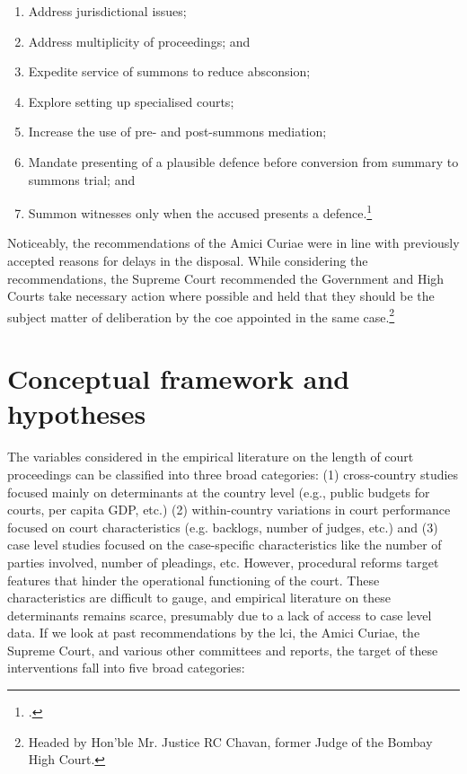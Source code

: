 \documentclass[12pt,a4paper]{article}
\begin{document}
\begin{enumerate}[label=(\alph*)]
\item Address jurisdictional issues;
\item Address multiplicity of proceedings; and
\item Expedite service of summons to reduce absconsion;
\item Explore setting up specialised courts;
\item Increase the use of pre- and post-summons mediation;
\item Mandate presenting of a plausible defence before conversion from summary to summons trial; and
\item Summon witnesses only when the accused presents a defence.\footcite{amicus2020_submission}
\end{enumerate}

Noticeably, the recommendations of the Amici Curiae were in line with previously accepted reasons for delays in the disposal. While considering the recommendations, the Supreme Court recommended the Government and High Courts take necessary action where possible and held that they should be the subject matter of deliberation by the \gls{coe} appointed in the same case.\footnote{Headed by Hon’ble Mr. Justice RC Chavan, former Judge of the Bombay High Court.}

\section{Conceptual framework and hypotheses}
\label{sec:select-case-char}

The variables considered in the empirical literature on the length of court proceedings can be classified into three broad categories: (1) cross-country studies focused mainly on determinants at the country level (e.g., public budgets for courts, per capita GDP, etc.) (2) within-country variations in court performance focused on court characteristics (e.g. backlogs, number of judges, etc.) and (3) case level studies focused on the case-specific characteristics like the number of parties involved, number of pleadings, etc. However, procedural reforms target features that hinder the operational functioning of the court. These characteristics are difficult to gauge, and empirical literature on these determinants remains scarce, presumably due to a lack of access to case level data. If we look at past recommendations by the \gls{lci}, the Amici Curiae, the Supreme Court, and various other committees and reports, the target of these interventions fall into five broad categories:
\end{document}
